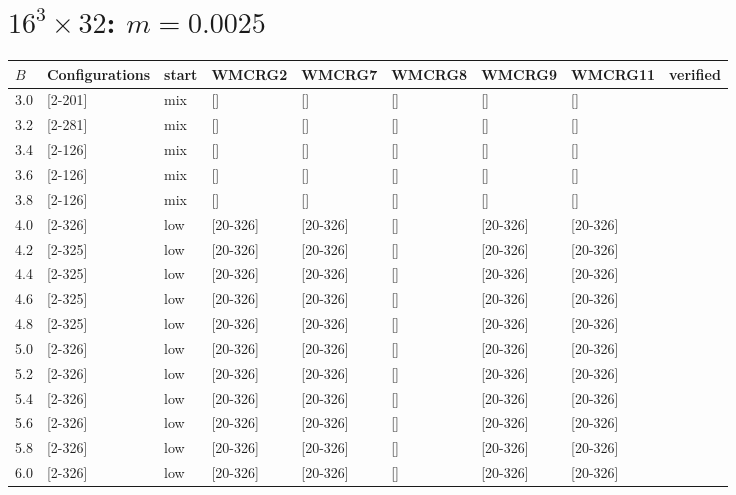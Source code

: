 \documentclass{article}
\begin{document}
  \section*{$16^3\times32$:  $m=0.0025$}
    \begin{tabular}{| l | l | l | l | l | l | l | l | l |}
      \hline
      $B$ & Configurations & start & WMCRG2 & WMCRG7 & WMCRG8 & WMCRG9 & WMCRG11 & verified\\
      \hline
      3.0 & [2-201] & mix & [] & [] & [] & [] & [] &\\
      3.2 & [2-281] & mix & [] & [] & [] & [] & [] &\\
      3.4 & [2-126] & mix & [] & [] & [] & [] & [] &\\
      3.6 & [2-126] & mix & [] & [] & [] & [] & [] &\\
      3.8 & [2-126] & mix & [] & [] & [] & [] & [] &\\
      4.0 & [2-326] & low & [20-326] & [20-326] & [] & [20-326] & [20-326] &\\
      4.2 & [2-325] & low & [20-326] & [20-326] & [] & [20-326] & [20-326] &\\
      4.4 & [2-325] & low & [20-326] & [20-326] & [] & [20-326] & [20-326] &\\
      4.6 & [2-325] & low & [20-326] & [20-326] & [] & [20-326] & [20-326] &\\
      4.8 & [2-325] & low & [20-326] & [20-326] & [] & [20-326] & [20-326] &\\
      5.0 & [2-326] & low & [20-326] & [20-326] & [] & [20-326] & [20-326] &\\
      5.2 & [2-326] & low & [20-326] & [20-326] & [] & [20-326] & [20-326] &\\
      5.4 & [2-326] & low & [20-326] & [20-326] & [] & [20-326] & [20-326] &\\
      5.6 & [2-326] & low & [20-326] & [20-326] & [] & [20-326] & [20-326] &\\
      5.8 & [2-326] & low & [20-326] & [20-326] & [] & [20-326] & [20-326] &\\
      6.0 & [2-326] & low & [20-326] & [20-326] & [] & [20-326] & [20-326] &\\
      \hline
    \end{tabular}
\end{document}
